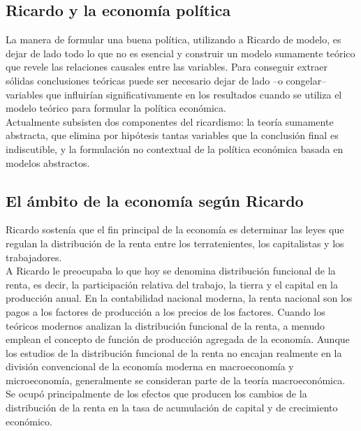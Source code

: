 \documentclass[10pt]{book}
\begin{document}
\subsection*{Ricardo y  la economía política}
La manera de formular una buena política, utilizando a Ricardo de modelo, es dejar de lado todo lo que no es esencial y construir un modelo sumamente teórico que revele las relaciones causales entre las variables. Para conseguir extraer sólidas conclusiones teóricas puede ser necesario dejar de lado –o congelar– variables que influirían significativamente en los resultados cuando se utiliza el modelo teórico para formular la política económica.\\
Actualmente subsisten dos componentes del ricardismo: la teoría sumamente abstracta, que elimina por hipótesis tantas variables que la conclusión final es indiscutible, y la formulación no contextual de la política económica basada en modelos abstractos.

\subsection*{El ámbito de la economía según Ricardo}
Ricardo sostenía que el fin principal de la economía es determinar las leyes que regulan la distribución de la renta entre los terratenientes, los capitalistas y los trabajadores.\\
A Ricardo le preocupaba lo que hoy se denomina distribución funcional de la renta, es decir, la participación relativa del trabajo, la tierra y el capital en la producción anual. En la contabilidad nacional moderna, la renta nacional son los pagos a los factores de producción a los precios de los factores. Cuando los teóricos modernos analizan la distribución funcional de la renta, a menudo emplean el concepto de función de producción agregada de la economía. Aunque los estudios de la distribución funcional de la renta no encajan realmente en la división convencional de la economía moderna en macroeconomía y microeconomía, generalmente se consideran parte de la teoría macroeconómica.\\
Se ocupó principalmente de los efectos que producen los cambios de la distribución de la renta en la tasa de acumulación de capital y de crecimiento económico.\\
\end{document}
